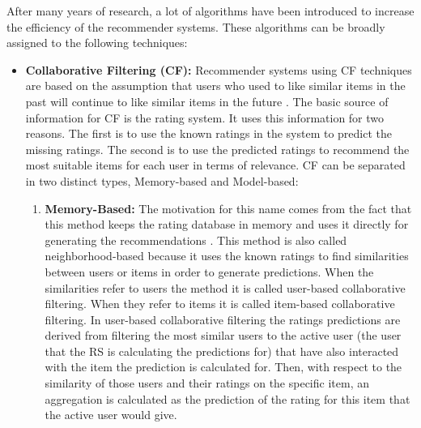 After many years of research, a lot of algorithms have been introduced to
increase the efficiency of the recommender systems. These algorithms can be
broadly assigned to the following techniques:

\begin{itemize}
	\item \textbf{Collaborative Filtering (CF):} Recommender systems using CF
    techniques are based on the assumption that users who used to like similar
    items in the past will continue to like similar items in the future
    \citep{Jannach}. The basic source of information for CF is the rating
    system. It uses this information for two reasons.
    The first is to use the known ratings in the system to predict the
    missing ratings. The second is to use the predicted ratings to
    recommend the most suitable items for each user in terms of relevance.
    CF can be separated in two distinct types, Memory-based and Model-based:\\
	\begin{enumerate}
    	\item \textbf{Memory-Based:} The motivation for this name comes from
        the fact that this method keeps the rating database in memory and uses
        it directly for generating the recommendations \citep{Jannach}.
    	This method is also called neighborhood-based because it uses the
        known ratings to find similarities between users or items in order to
        generate predictions.
    	When the similarities refer to users the method it is called user-based
        collaborative filtering. When they refer to items it is called
        item-based collaborative filtering.
    	In user-based collaborative filtering the ratings predictions
        are derived from filtering the most similar users to the active user
        (the user that the RS is calculating the predictions for) that
        have also interacted with the item the prediction is calculated for.
        Then, with respect to the similarity of those users and their ratings
        on the specific item, an aggregation is calculated as the prediction
        of the rating for this item that the active user would give.


\end{enumerate}
\end{itemize}
